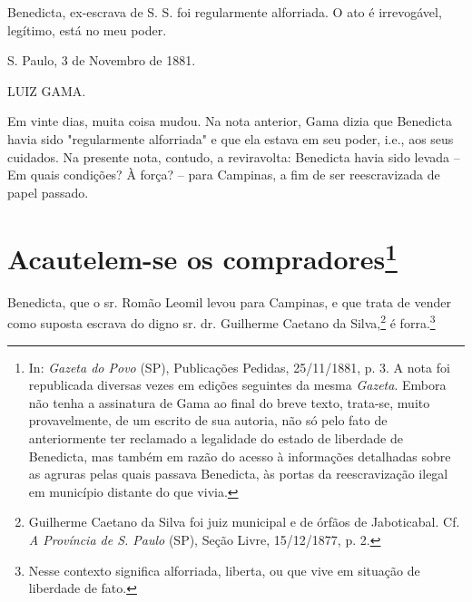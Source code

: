 {Benedicta, ex-escrava de S. S. foi regularmente alforriada. O ato é
irrevogável, legítimo, está no meu poder.

S. Paulo, 3 de Novembro de 1881.

LUIZ GAMA.

\pagebreak
\mbox{}\vfill
\thispagestyle{empty}

{\small\noindent
Em vinte dias, muita coisa mudou. Na nota anterior, Gama dizia que
Benedicta havia sido "regularmente alforriada" e que ela estava em seu
poder, i.e., aos seus cuidados. Na presente nota, contudo, a
reviravolta: Benedicta havia sido levada -- Em quais condições? À força?
-- para Campinas, a fim de ser reescravizada de papel passado.}

\chapter{Acautelem-se os compradores\footnote[*]{In: \emph{Gazeta do Povo} (SP), Publicações
  Pedidas, 25/11/1881, p. 3. A nota foi republicada diversas vezes em
  edições seguintes da mesma \emph{Gazeta}. Embora não tenha a
  assinatura de Gama ao final do breve texto, trata-se, muito
  provavelmente, de um escrito de sua autoria, não só pelo fato de
  anteriormente ter reclamado a legalidade do estado de liberdade de
  Benedicta, mas também em razão do acesso à informações detalhadas
  sobre as agruras pelas quais passava Benedicta, às portas da
  reescravização ilegal em município distante do que vivia.}}

Benedicta, que o sr. Romão Leomil levou para Campinas, e que trata de
vender como suposta escrava do digno sr. dr. Guilherme Caetano da
Silva,\footnote{Guilherme Caetano da Silva foi juiz municipal e de
  órfãos de Jaboticabal. Cf. \emph{A Província de S. Paulo} (SP), Seção
  Livre, 15/12/1877, p. 2.} é forra.\footnote{Nesse contexto significa
  alforriada, liberta, ou que vive em situação de liberdade de fato.}

\pagebreak
\mbox{}\vfill
\thispagestyle{empty}

}
